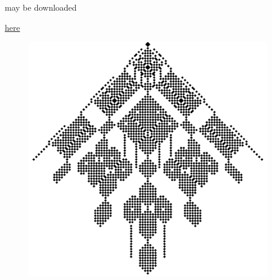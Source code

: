 \documentclass[11pt, twoside,openright]{article}
\begin{document}
\newpage

\thispagestyle{empty}

\vspace*{\fill}

\begin{center}
\qlanth may be downloaded

\href{https://github.com/zia-lab/qlanth}{here}
\vspace{-0.4cm}
\begin{figure}[h!]
	\begin{center}
		\includegraphics[width=0.95\textwidth]{./figures/pr_code.png}
	\end{center}
\end{figure}
\end{center}

\vspace*{\fill}

\cleardoublepage

\thispagestyle{empty}

\vspace*{\fill}
\end{document}
